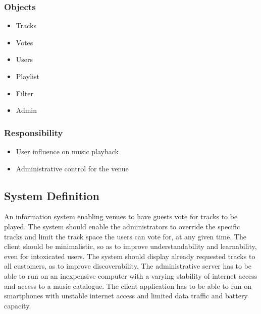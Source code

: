 \subsubsection{Objects}
\begin{itemize}
    \item Tracks
    \item Votes
    \item Users
    \item Playlist
    \item Filter
    \item Admin
\end{itemize}

\subsubsection{Responsibility}
\begin{itemize}
    \item User influence on music playback
    \item Administrative control for the venue
\end{itemize}

\subsection{System Definition}
An information system enabling venues to have guests vote for tracks to be played. The system should enable the administrators to override the specific tracks and limit the track space the users can vote for, at any given time. The client should be minimalistic, so as to improve understandability and learnability, even for intoxicated users. The system should display already requested tracks to all customers, as to improve discoverability.
The administrative server has to be able to run on an inexpensive computer with a varying stability of internet access and access to a music catalogue. The client application has to be able to run on smartphones with unstable internet access and limited data traffic and battery capacity.